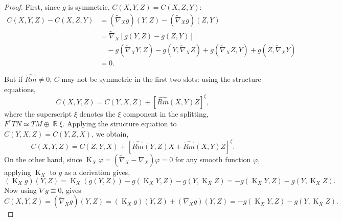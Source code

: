 \documentclass{amsart}
\theoremstyle{definition}
\theoremstyle{remark}
\DeclareMathOperator{\diff}{K}
\DeclareMathOperator{\RR}{\mathbb{R}}
\numberwithin{equation}{section}
\begin{document}
\begin{proof}
First, since $g$ is symmetric, $C(X, Y, Z) = C(X, Z, Y)$:
\[
\begin{split}
C(X, Y, Z) - C(X, Z, Y) &= (\tilde{\nabla}_X g) (Y, Z) - (\tilde{\nabla}_X g) (Z, Y) \\
&= \tilde{\nabla}_X \left[g(Y, Z) - g(Z, Y)\right] \\
&\quad - g(\tilde{\nabla}_X Y, Z) - g(Y, \tilde{\nabla}_X Z) + g(\tilde{\nabla}_X Z, Y) + g(Z, \tilde{\nabla}_X Y) \\
&= 0.
\end{split}
\]

But if $\widehat{Rm} \ne 0$, $C$ may not be symmetric in the first two slots: using the structure equations,
\[
C(X, Y, Z) = C(Y, X, Z) + [\widehat{Rm}(X, Y)Z]^{\xi},
\]
where the superscript $\xi$ denotes the $\xi$ component in the splitting, $F^{\ast} TN \simeq TM \oplus \RR \xi$. Applying the structure equation to $C(Y, X, Z) = C(Y, Z, X)$, we obtain,
\begin{equation}
\label{eq:cubic_permutation1}
C(X, Y, Z) = C(Z, Y, X) + \left[\widehat{Rm}(Y, Z) X + \widehat{Rm}(X, Y) Z\right]^{\xi}.
\end{equation}
On the other hand, since $\diff_X \varphi = (\tilde{\nabla}_X - \nabla_X) \varphi = 0$ for any smooth function $\varphi$, applying $\diff_X$ to $g$ as a derivation gives,
\[
(\diff_X g) (Y, Z) = \diff_X (g(Y, Z)) - g(\diff_X Y, Z) - g(Y, \diff_X Z) = -g(\diff_X Y, Z) - g(Y, \diff_X Z).
\]
Now using $\nabla g \equiv 0$, gives
\begin{equation}
\label{eq:cubic_derivation_identity}
C(X, Y, Z) = (\tilde{\nabla}_X g) (Y, Z) = (\diff_X g) (Y, Z) + (\nabla_X g) (Y, Z) = -g(\diff_X Y, Z) - g(Y, \diff_X Z).
\end{equation}


\end{proof}
\end{document}
